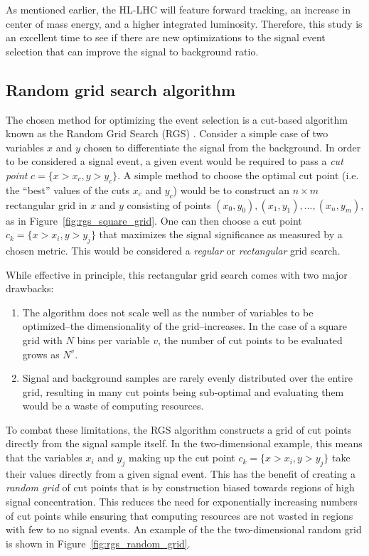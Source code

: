As mentioned earlier, the HL-LHC will feature forward tracking, an increase in center of mass energy, and a higher integrated luminosity.
Therefore, this study is an excellent time to see if there are new optimizations to the signal event selection that can improve the signal to background ratio.

%
\subsection{Random grid search algorithm}\label{sswwupgrade:opt_rgs}
The chosen method for optimizing the event selection is a cut-based algorithm known as the Random Grid Search (RGS) \cite{2018.rgs-paper}.
Consider a simple case of two variables $x$ and $y$ chosen to differentiate the signal from the background.
In order to be considered a signal event, a given event would be required to pass a \emph{cut point} $c = \{x > x_c, y > y_c\}$.
A simple method to choose the optimal cut point (i.e. the ``best'' values of the cuts $x_c$ and $y_c$) would be to construct an $n\times m$ rectangular grid in $x$ and $y$ consisting of points $(x_0,y_0), (x_1,y_1), ..., (x_n,y_m)$, as in Figure~\ref{fig:rgs_square_grid}.
One can then choose a cut point $c_k = \{x > x_i, y > y_j\}$ that maximizes the signal significance as measured by a chosen metric.
This would be considered a \emph{regular} or \emph{rectangular} grid search.

While effective in principle, this rectangular grid search comes with two major drawbacks:
\begin{enumerate}
\item The algorithm does not scale well as the number of variables to be optimized--the dimensionality of the grid--increases.  In the case of a square grid with $N$ bins per variable $v$, the number of cut points to be evaluated grows as $N^v$.
\item Signal and background samples are rarely evenly distributed over the entire grid, resulting in many cut points being sub-optimal and evaluating them would be a waste of computing resources.
\end{enumerate}

To combat these limitations, the RGS algorithm constructs a grid of cut points directly from the signal sample itself.
In the two-dimensional example, this means that the variables $x_i$ and $y_j$ making up the cut point $c_k = \{x > x_i, y > y_j\}$ take their values directly from a given signal event.
This has the benefit of creating a \emph{random grid} of cut points that is by construction  biased towards regions of high signal concentration.
This reduces the need for exponentially increasing numbers of cut points while ensuring that computing resources are not wasted in regions with few to no signal events.
An example of the the two-dimensional random grid is shown in Figure~\ref{fig:rgs_random_grid}.

